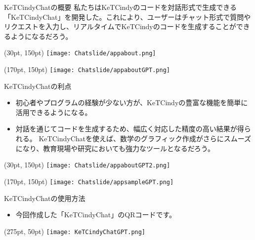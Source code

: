 \documentclass[aspectratio=169, dvipdfmx, 11pt,uplatex]{beamer} %
\begin{document}
\begin{frame}{KeTCindyChatの概要}
私たちはKeTCindyのコードを対話形式で生成できる「KeTCindyChat」を開発した。これにより、ユーザーはチャット形式で質問やリクエストを入力し、リアルタイムでKeTCindyのコードを生成することができるようになるだろう。
\begin{textblock*}{0.3\linewidth}(30pt, 150pt)
    \centering
    \texttt{[image: Chatslide/appabout.png]}
  \end{textblock*}
  
  \begin{textblock*}{0.3\linewidth}(170pt, 150pt)
    \centering
    \texttt{[image: Chatslide/appaboutGPT.png]}
  \end{textblock*}
\end{frame}
  
\begin{frame}{KeTCindyChatの利点}
\begin{itemize}
\item 初心者やプログラムの経験が少ない方が、KeTCindyの豊富な機能を簡単に活用できるようになる。
\item 対話を通じてコードを生成するため、幅広く対応した精度の高い結果が得られる。
KeTCindyChatを使えば、数学のグラフィック作成がさらにスムーズになり、教育現場や研究においても強力なツールとなるだろう。
\end{itemize}
  \begin{textblock*}{0.3\linewidth}(30pt, 150pt)
    \centering
    \texttt{[image: Chatslide/appaboutGPT2.png]}
  \end{textblock*}
  
  \begin{textblock*}{0.3\linewidth}(170pt, 150pt)
    \centering
    \texttt{[image: Chatslide/appsampleGPT.png]}
  \end{textblock*}
  
\end{frame}


\begin{frame}{KeTCindyChatの使用方法}
\begin{itemize}
 \item 今回作成した「KeTCindyChat」のQRコードです。
\end{itemize}
  \begin{textblock*}{0.4\linewidth}(275pt, 50pt)
    \centering
    \texttt{[image: KeTCindyChatGPT.png]}
  \end{textblock*}
\end{frame}
\end{document}
